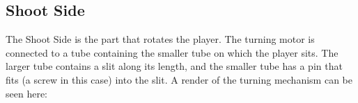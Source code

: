 
\subsection{Shoot Side}\label{subsec:turn-side}
The Shoot Side is the part that rotates the player.
The turning motor is connected to a tube containing the smaller tube on which the player sits.
The larger tube contains a slit along its length, and the smaller tube has a pin that fits (a screw in this case) into the slit.
A render of the turning mechanism can be seen here:

\noindent

\scalebox{0.9}{

    \begin{center}
        \begin{tikzpicture}


\end{tikzpicture}
\end{center}}
